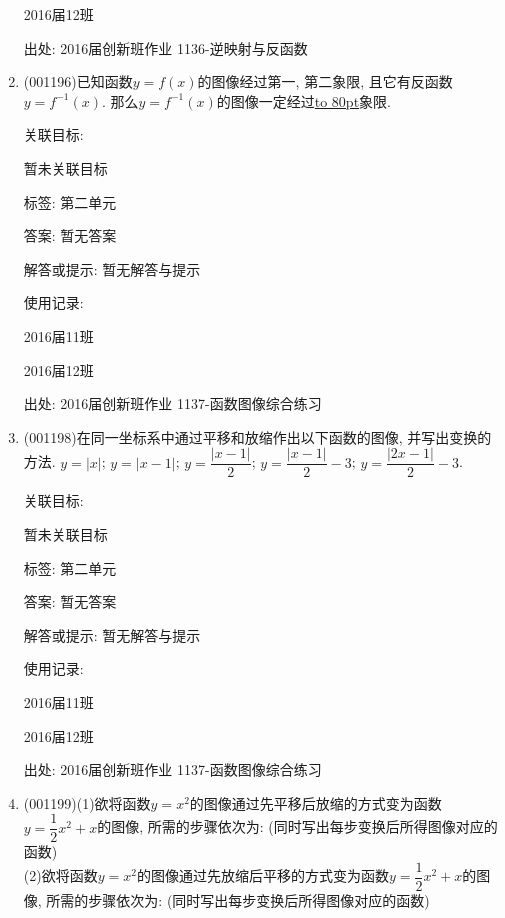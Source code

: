 \documentclass[10pt,a4paper]{article}
\newcommand{\blank}[1]{\underline{\hbox to #1pt{}}}
\begin{document}
\begin{enumerate}[1.]
2016届12班	


出处: 2016届创新班作业	1136-逆映射与反函数
\item { (001196)}已知函数$y=f(x)$的图像经过第一, 第二象限, 且它有反函数$y=f^{-1}(x)$. 那么$y=f^{-1}(x)$的图像一定经过\blank{80}象限.


关联目标:

暂未关联目标



标签: 第二单元

答案: 暂无答案

解答或提示: 暂无解答与提示

使用记录:

2016届11班	

2016届12班	


出处: 2016届创新班作业	1137-函数图像综合练习
\item { (001198)}在同一坐标系中通过平移和放缩作出以下函数的图像, 并写出变换的方法.
$y=|x|$; $y=|x-1|$; $y=\dfrac{|x-1|}2$; $y=\dfrac{|x-1|}2-3$; $y=\dfrac{|2x-1|}2-3$.
\begin{center}
\end{center}


关联目标:

暂未关联目标



标签: 第二单元

答案: 暂无答案

解答或提示: 暂无解答与提示

使用记录:

2016届11班	

2016届12班	


出处: 2016届创新班作业	1137-函数图像综合练习
\item { (001199)}(1)欲将函数$y=x^2$的图像通过先平移后放缩的方式变为函数$y=\dfrac{1}{2}x^2+x$的图像, 所需的步骤依次为: (同时写出每步变换后所得图像对应的函数)\\ 
(2)欲将函数$y=x^2$的图像通过先放缩后平移的方式变为函数$y=\dfrac{1}{2}x^2+x$的图像, 所需的步骤依次为: (同时写出每步变换后所得图像对应的函数)



\end{enumerate}
\end{document}
